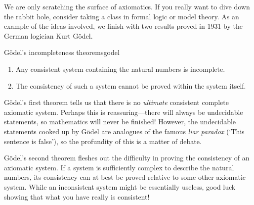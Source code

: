 \vfil


We are only scratching the surface of axiomatics. If you really want to dive down the rabbit hole, consider taking a class in formal logic or model theory. As an example of the ideas involved, we finish with two results proved in 1931 by the German logician Kurt Gödel.


\begin{thm}{Gödel's incompleteness theorems}{godel} 
	\begin{enumerate}
	  \item Any consistent system containing the natural numbers is incomplete.
	  \item The consistency of such a system cannot be proved within the system itself.
	\end{enumerate}
\end{thm}

Gödel's first theorem tells us that there is no \emph{ultimate} consistent complete axiomatic system. Perhaps this is reassuring---there will always be undecidable statements, so mathematics will never be finished! However, the undecidable statements cooked up by Gödel are analogues of the famous \emph{liar paradox} (`This sentence is false'), so the profundity of this is a matter of debate.
\smallbreak

Gödel's second theorem fleshes out the difficulty in proving the consistency of an axiomatic system. If a system is sufficiently complex to describe the natural numbers, its consistency can at best be proved relative to some other axiomatic system. While an inconsistent system might be essentially useless, good luck showing that what you have really is consistent!


\goodbreak


